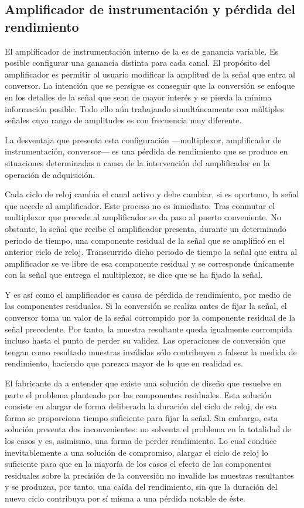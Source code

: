 \subsection[El amplificador de instrumentación] {Amplificador de
instrumentación y pérdida del rendimiento}

El amplificador de instrumentación interno de la \kpci{} es de ganancia
variable. Es posible configurar una ganancia distinta para cada canal. El
propósito del amplificador es permitir al usuario modificar la amplitud de
la señal que entra al conversor. La intención que se persigue es conseguir
que la conversión se enfoque en los detalles de la señal que sean de mayor
interés y se pierda la mínima información posible. Todo ello aún trabajando
simultáneamente con múltiples señales cuyo rango de amplitudes es con
frecuencia muy diferente.

La desventaja que presenta esta configuración ---multiplexor, amplificador
de instrumentación, conversor--- es una pérdida de rendimiento que se
produce en situaciones determinadas a causa de la intervención del
amplificador en la operación de adquisición.

Cada ciclo de reloj cambia el canal activo y debe cambiar, si es oportuno,
la señal que accede al amplificador. Este proceso no es inmediato. Tras
conmutar el multiplexor que precede al amplificador se da paso al puerto
conveniente. No obstante, la señal que recibe el amplificador presenta,
durante un determinado periodo de tiempo, una componente residual de la
señal que se amplificó en el anterior ciclo de reloj. Transcurrido dicho
periodo de tiempo la señal que entra al amplificador se ve libre de esa
componente residual y se corresponde únicamente con la señal que entrega el
multiplexor, se dice que se ha fijado la señal.

Y es así como el amplificador es causa de pérdida de rendimiento, por medio
de las componentes residuales. Si la conversión se realiza antes de fijar
la señal, el conversor toma un valor de la señal corrompido por la
componente residual de la señal precedente. Por tanto, la muestra
resultante queda igualmente corrompida incluso hasta el punto de perder su
validez. Las operaciones de conversión que tengan como resultado muestras
inválidas sólo contribuyen a falsear la medida de rendimiento, haciendo que
parezca mayor de lo que en realidad es.

El fabricante da a entender que existe una solución de diseño que resuelve
en parte el problema planteado por las componentes residuales. Esta
solución consiste en alargar de forma deliberada la duración del ciclo de
reloj, de esa forma se proporciona tiempo suficiente para fijar la señal.
Sin embargo, esta solución presenta dos inconvenientes: no solventa el
problema en la totalidad de los casos y es, asimismo, una forma de perder
rendimiento. Lo cual conduce inevitablemente a una solución de compromiso,
alargar el ciclo de reloj lo suficiente para que en la mayoría de los casos
el efecto de las componentes residuales sobre la precisión de la conversión
no invalide las muestras resultantes y se produzca, por tanto, una caída
del rendimiento, sin que la duración del nuevo ciclo contribuya por sí
misma a una pérdida notable de éste.


